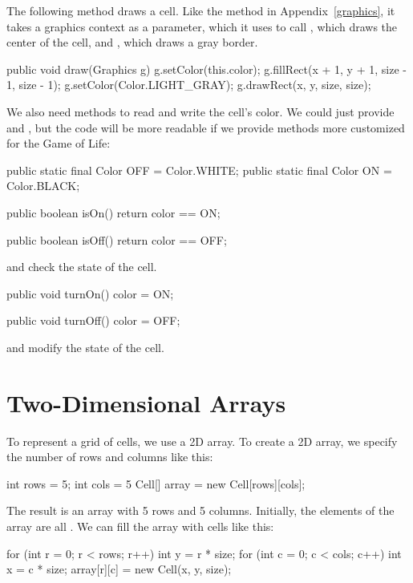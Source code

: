 The following method draws a cell.
Like the  method in Appendix~\ref{graphics},
it takes a graphics context as a parameter, which it uses to
call , which draws the center of the cell, and , which draws a gray border.

\begin{code}
public void draw(Graphics g) {
    g.setColor(this.color);
    g.fillRect(x + 1, y + 1, size - 1, size - 1);
    g.setColor(Color.LIGHT_GRAY);
    g.drawRect(x, y, size, size);
}
\end{code}

We also need methods to read and write the cell's color.
We could just provide  and ,
but the code will be more readable if we provide methods more customized for the Game of Life:

\begin{code}
public static final Color OFF = Color.WHITE;
public static final Color ON = Color.BLACK;

public boolean isOn() {
    return color == ON;
}

public boolean isOff() {
    return color == OFF;
}
\end{code}

 and  check the state of the cell.

\begin{code}
public void turnOn() {
    color = ON;
}

public void turnOff() {
    color = OFF;
}
\end{code}

 and  modify the state of the cell.


\section{Two-Dimensional Arrays}

To represent a grid of cells, we use a 2D array.
To create a 2D array, we specify the number of rows and columns like this:

\begin{code}
int rows = 5;
int cols = 5
Cell[] array = new Cell[rows][cols];
\end{code}

The result is an array with 5 rows and 5 columns.
Initially, the elements of the array are all .
We can fill the array with cells like this:

\begin{code}
for (int r = 0; r < rows; r++) {
    int y = r * size;
    for (int c = 0; c < cols; c++) {
        int x = c * size;
        array[r][c] = new Cell(x, y, size);
    }
}
\end{code}

